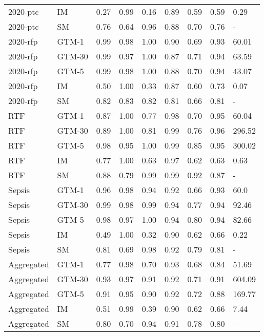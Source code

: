 \begin{tabular}{llrrrrrrl}
2020-ptc & IM & 0.27 & 0.99 & 0.16 & 0.89 & 0.59 & 0.59 & 0.29 \\
2020-ptc & SM & 0.76 & 0.64 & 0.96 & 0.88 & 0.70 & 0.76 & - \\
2020-rfp & GTM-1 & 0.99 & 0.98 & 1.00 & 0.90 & 0.69 & 0.93 & 60.01 \\
2020-rfp & GTM-30 & 0.99 & 0.97 & 1.00 & 0.87 & 0.71 & 0.94 & 63.59 \\
2020-rfp & GTM-5 & 0.99 & 0.98 & 1.00 & 0.88 & 0.70 & 0.94 & 43.07 \\
2020-rfp & IM & 0.50 & 1.00 & 0.33 & 0.87 & 0.60 & 0.73 & 0.07 \\
2020-rfp & SM & 0.82 & 0.83 & 0.82 & 0.81 & 0.66 & 0.81 & - \\
RTF & GTM-1 & 0.87 & 1.00 & 0.77 & 0.98 & 0.70 & 0.95 & 60.04 \\
RTF & GTM-30 & 0.89 & 1.00 & 0.81 & 0.99 & 0.76 & 0.96 & 296.52 \\
RTF & GTM-5 & 0.98 & 0.95 & 1.00 & 0.99 & 0.85 & 0.95 & 300.02 \\
RTF & IM & 0.77 & 1.00 & 0.63 & 0.97 & 0.62 & 0.63 & 0.63 \\
RTF & SM & 0.88 & 0.79 & 0.99 & 0.99 & 0.92 & 0.87 & - \\
Sepsis & GTM-1 & 0.96 & 0.98 & 0.94 & 0.92 & 0.66 & 0.93 & 60.0 \\
Sepsis & GTM-30 & 0.99 & 0.98 & 0.99 & 0.94 & 0.77 & 0.94 & 92.46 \\
Sepsis & GTM-5 & 0.98 & 0.97 & 1.00 & 0.94 & 0.80 & 0.94 & 82.66 \\
Sepsis & IM & 0.49 & 1.00 & 0.32 & 0.90 & 0.62 & 0.66 & 0.22 \\
Sepsis & SM & 0.81 & 0.69 & 0.98 & 0.92 & 0.79 & 0.81 & - \\
Aggregated & GTM-1 & 0.77 & 0.98 & 0.70 & 0.93 & 0.68 & 0.84 & 51.69 \\
Aggregated & GTM-30 & 0.93 & 0.97 & 0.91 & 0.92 & 0.71 & 0.91 & 604.09 \\
Aggregated & GTM-5 & 0.91 & 0.95 & 0.90 & 0.92 & 0.72 & 0.88 & 169.77 \\
Aggregated & IM & 0.51 & 0.99 & 0.39 & 0.90 & 0.62 & 0.66 & 7.44 \\
Aggregated & SM & 0.80 & 0.70 & 0.94 & 0.91 & 0.78 & 0.80 & - \\
\bottomrule
\end{tabular}
